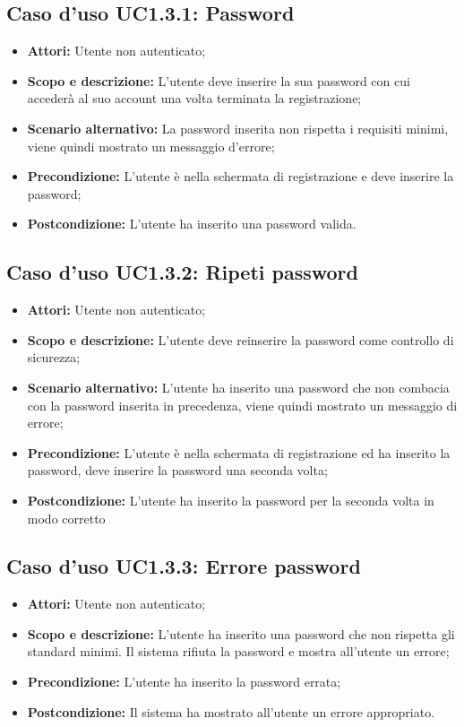 \documentclass[12pt,a4paper,titlepage]{article}
\begin{document}
	\subsection{Caso d'uso UC1.3.1: Password}
	\label{UC1.3.1}
	\begin{itemize}
		\item \textbf{Attori: }Utente non autenticato;
		\item \textbf{Scopo e descrizione: }L'utente deve inserire la sua password con cui accederà al suo account una volta terminata la registrazione;
		\item \textbf{Scenario alternativo: }La password inserita non rispetta i requisiti minimi, viene quindi mostrato un messaggio d'errore;
		\item \textbf{Precondizione: }L'utente è nella schermata di registrazione e deve inserire la password;
		\item \textbf{Postcondizione: }L'utente ha inserito una password valida.
	\end{itemize}
	\subsection{Caso d'uso UC1.3.2: Ripeti password}
	\label{UC1.3.2}
	\begin{itemize}
		\item \textbf{Attori: }Utente non autenticato;
		\item \textbf{Scopo e descrizione: }L'utente deve reinserire la password come controllo di sicurezza;
		\item \textbf{Scenario alternativo: }L'utente ha inserito una password che non combacia con la password inserita in precedenza, viene quindi mostrato un messaggio di errore;
		\item \textbf{Precondizione: }L'utente è nella schermata di registrazione ed ha inserito la password, deve inserire la password una seconda volta;
		\item \textbf{Postcondizione: }L'utente ha inserito la password per la seconda volta in modo corretto
	\end{itemize}
	\subsection{Caso d'uso UC1.3.3: Errore password}
	\label{UC1.3.3}
	\begin{itemize}
		\item \textbf{Attori: }Utente non autenticato;
		\item \textbf{Scopo e descrizione: }L'utente ha inserito una password che non rispetta gli standard minimi. Il sistema rifiuta la password e mostra all'utente un errore;
		\item \textbf{Precondizione: }L'utente ha inserito la password errata;
		\item \textbf{Postcondizione: }Il sistema ha mostrato all'utente un errore appropriato.
	\end{itemize}
\end{document}

